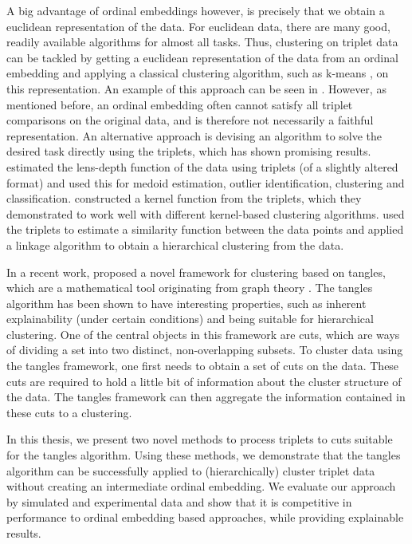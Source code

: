 A big advantage of ordinal embeddings however, is precisely that we obtain a euclidean representation of the data. 
For euclidean data, there are many good, readily available algorithms for almost all tasks. 
Thus, clustering on triplet data can be tackled by getting a euclidean representation of the data
from an ordinal embedding and applying a classical clustering algorithm, such as k-means \citep{lloydLeastSquaresQuantization1982}, on 
this representation. An example of this approach can be seen in \citep{kleindessnerLensDepthFunction2017}. However, as mentioned before, an ordinal embedding 
often cannot satisfy all triplet comparisons on the original data, and is therefore not 
necessarily a faithful representation. 
An alternative approach is devising an algorithm to solve the desired task directly 
using the triplets, which has shown promising results.
\cite{kleindessnerLensDepthFunction2017} estimated the lens-depth function
of the data using triplets (of a slightly altered format) and used this for 
medoid estimation, outlier identification, clustering and classification. 
\cite{kleindessnerKernelFunctionsBased2017} constructed a kernel function from
the triplets, which they demonstrated to work well with 
different kernel-based clustering algorithms.
\cite{ghoshdastidarFoundationsComparisonBasedHierarchical2019} used the 
triplets to estimate a similarity function between the data points and applied 
a linkage algorithm to obtain a hierarchical clustering from the data.

In a recent work, \cite{klepperClusteringTanglesAlgorithmic2021} proposed a novel framework
for clustering based on tangles, which are a mathematical tool originating from graph theory 
\citep{robertsonGraphMinorsObstructions1991}. The tangles algorithm has been shown to have 
interesting properties, such as inherent explainability (under certain conditions) and being suitable for hierarchical clustering.
One of the central objects in this framework are cuts, which are ways of dividing a set into
two distinct, non-overlapping subsets. To cluster data using the tangles framework, one first
needs to obtain a set of cuts on the data. These cuts are required to
hold a little bit of information about the cluster structure of the data. The 
tangles framework can then aggregate the information contained in these cuts to a
clustering. 

In this thesis, we present two novel methods to process triplets to cuts suitable for the
tangles algorithm. Using these methods, we 
demonstrate that the tangles algorithm can be successfully applied to (hierarchically) cluster triplet data without creating an intermediate ordinal embedding. 
We evaluate our approach by simulated and experimental data and show that it is competitive 
in performance to ordinal embedding based approaches, while providing explainable results. 

